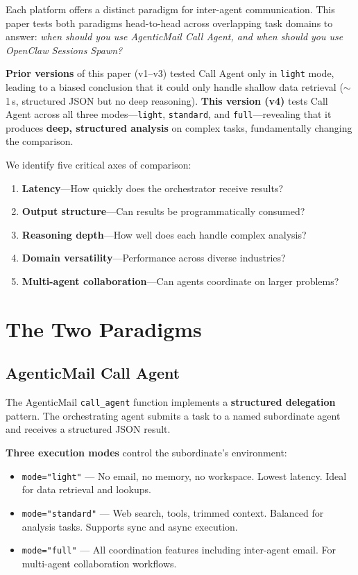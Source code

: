\documentclass[11pt,twocolumn]{article}
\begin{document}
Each platform offers a distinct paradigm for inter-agent communication. This paper tests both paradigms head-to-head across overlapping task domains to answer: \emph{when should you use AgenticMail Call Agent, and when should you use OpenClaw Sessions Spawn?}

\textbf{Prior versions} of this paper (v1--v3) tested Call Agent only in \texttt{light} mode, leading to a biased conclusion that it could only handle shallow data retrieval ($\sim$1\,s, structured JSON but no deep reasoning). \textbf{This version (v4)} tests Call Agent across all three modes---\texttt{light}, \texttt{standard}, and \texttt{full}---revealing that it produces \textbf{deep, structured analysis} on complex tasks, fundamentally changing the comparison.

We identify five critical axes of comparison:

\begin{enumerate}[itemsep=2pt,topsep=4pt]
    \item \textbf{Latency}---How quickly does the orchestrator receive results?
    \item \textbf{Output structure}---Can results be programmatically consumed?
    \item \textbf{Reasoning depth}---How well does each handle complex analysis?
    \item \textbf{Domain versatility}---Performance across diverse industries?
    \item \textbf{Multi-agent collaboration}---Can agents coordinate on larger problems?
\end{enumerate}

\section{The Two Paradigms}

\subsection{AgenticMail Call Agent}

The AgenticMail \texttt{call\_agent} function implements a \textbf{structured delegation} pattern. The orchestrating agent submits a task to a named subordinate agent and receives a structured JSON result.

\textbf{Three execution modes} control the subordinate's environment:

\begin{itemize}[itemsep=2pt,topsep=2pt]
    \item \texttt{mode="light"} --- No email, no memory, no workspace. Lowest latency. Ideal for data retrieval and lookups.
    \item \texttt{mode="standard"} --- Web search, tools, trimmed context. Balanced for analysis tasks. Supports sync and async execution.
    \item \texttt{mode="full"} --- All coordination features including inter-agent email. For multi-agent collaboration workflows.
\end{itemize}
\end{document}
